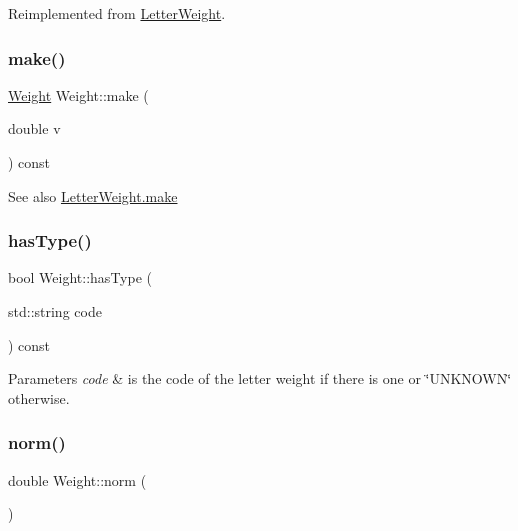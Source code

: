 Reimplemented from \mbox{\hyperlink{group__weight_gad1208e74e54ca8fc2f361e6fc106df01}{Letter\+Weight}}.

\mbox{\label{group__weight_gaf8f62c5cee5ffa37e30ef7239a33b729}} 
\subsubsection{\texorpdfstring{make()}{make()}\hspace{0.1cm}{\footnotesize\ttfamily [2/2]}}
{\footnotesize\ttfamily \mbox{\hyperlink{classWeight}{Weight}} Weight\+::make (\begin{DoxyParamCaption}\item[{double}]{v }\end{DoxyParamCaption}) const}

\begin{DoxySeeAlso}{See also}
\mbox{\hyperlink{classLetterWeight_af1f898e0845f59299440fc50a58fd2f1}{Letter\+Weight.\+make}} 
\end{DoxySeeAlso}
\mbox{\label{group__weight_gad236331c6f6ca8dd9fced5ffffd79f35}} 
\subsubsection{\texorpdfstring{hasType()}{hasType()}}
{\footnotesize\ttfamily bool Weight\+::has\+Type (\begin{DoxyParamCaption}\item[{std\+::string}]{code }\end{DoxyParamCaption}) const}


\begin{DoxyParams}{Parameters}
{\em code} & is the code of the letter weight if there is one or \char`\"{}\+U\+N\+K\+N\+O\+W\+N\char`\"{} otherwise. \\
\hline
\end{DoxyParams}
\mbox{\label{group__weight_ga68bd9621500f31ba5f0fbe04dc5a00e4}} 
\subsubsection{\texorpdfstring{norm()}{norm()}\hspace{0.1cm}{\footnotesize\ttfamily [3/3]}}
{\footnotesize\ttfamily double Weight\+::norm (\begin{DoxyParamCaption}{ }\end{DoxyParamCaption})}

